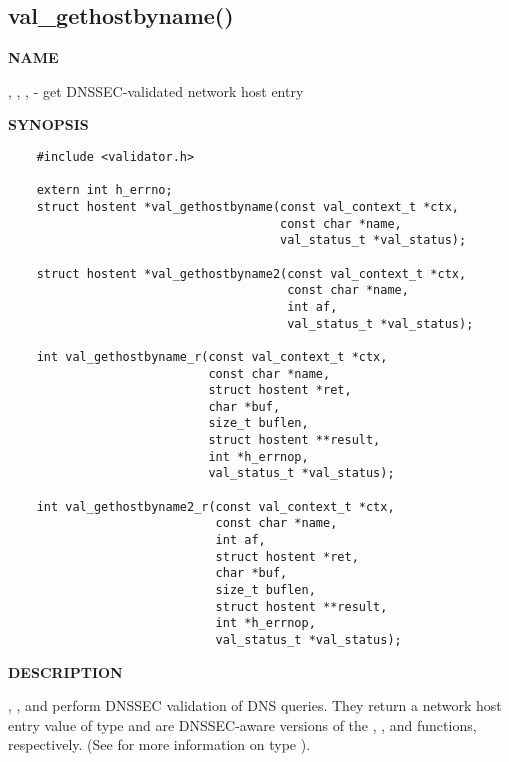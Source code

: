 \clearpage

\subsection{\bf val\_gethostbyname()}

{\bf NAME}

, ,
,  -
get DNSSEC-validated network host entry

{\bf SYNOPSIS}

\begin{verbatim}
    #include <validator.h>

    extern int h_errno;
    struct hostent *val_gethostbyname(const val_context_t *ctx,
                                      const char *name,
                                      val_status_t *val_status);

    struct hostent *val_gethostbyname2(const val_context_t *ctx,
                                       const char *name,
                                       int af,
                                       val_status_t *val_status);

    int val_gethostbyname_r(const val_context_t *ctx,
                            const char *name,
                            struct hostent *ret,
                            char *buf,
                            size_t buflen,
                            struct hostent **result,
                            int *h_errnop,
                            val_status_t *val_status);

    int val_gethostbyname2_r(const val_context_t *ctx,
                             const char *name,
                             int af,
                             struct hostent *ret,
                             char *buf,
                             size_t buflen,
                             struct hostent **result,
                             int *h_errnop,
                             val_status_t *val_status);
\end{verbatim}

{\bf DESCRIPTION}

, ,
 and 
perform DNSSEC validation of DNS queries.  They return a network host entry
value of type  and are DNSSEC-aware versions of the
, , 
and  functions, respectively.  (See
 for more information on type ).

